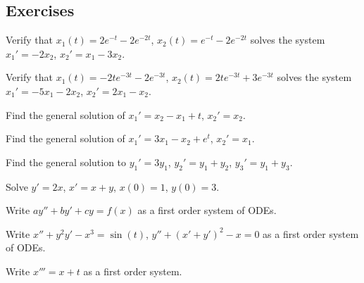 \subsection{Exercises}

\begin{exercise}
Verify that $x_1(t) = 2e^{-t} - 2e^{-2t}$, $x_2(t) = e^{-t} - 2e^{-2t}$ solves the system $x_1' = - 2x_2 $, $x_2' = x_1 - 3x_2$.  
\end{exercise}

\begin{exercise}
Verify that $x_1(t) = -2te^{-3t} - 2e^{-3t}$, $x_2(t) = 2te^{-3t} + 3e^{-3t}$ solves the system $x_1' = -5x_1 - 2x_2 $, $x_2' = 2x_1 - x_2$.  
\end{exercise}

\begin{exercise}
Find the general solution of $x_1' = x_2 - x_1 + t$, $x_2' = x_2$.
\end{exercise}

\begin{exercise}
Find the general solution of $x_1' = 3 x_1 - x_2 + e^t$, $x_2' = x_1$.
\end{exercise}

\begin{exercise}\ansMark%
Find the general solution to $y_1' = 3 y_1$, $y_2' = y_1 + y_2$,
$y_3' = y_1 + y_3$.
\end{exercise}

\begin{exercise}\ansMark%
Solve $y'=2x$, $x'=x+y$, $x(0)=1$, $y(0)=3$.
\end{exercise}


\begin{exercise}
Write $ay'' + by' + cy = f(x)$
as a first order system of ODEs.
\end{exercise}

\begin{exercise}
Write $x'' + y^2 y' - x^3 = \sin(t)$, 
$y'' + {(x'+y')}^2 -x = 0$ as a first order system of ODEs.
\end{exercise}

\begin{exercise}\ansMark%
Write $x''' = x+t$ as a first order system.
\end{exercise}

